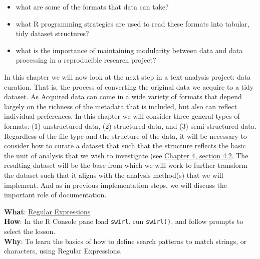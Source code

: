 \documentclass[
  letterpaper,
]{latex/krantz}
\providecommand{\tightlist}{%
  \setlength{\itemsep}{0pt}\setlength{\parskip}{0pt}}\usepackage{longtable,booktabs,array}
\begin{document}
\begin{tcolorbox}[enhanced jigsaw, toprule=.15mm, bottomtitle=1mm, coltitle=black, title=\textcolor{quarto-callout-note-color}{\faInfo}\hspace{0.5em}{Keys}, left=2mm, colframe=quarto-callout-note-color-frame, bottomrule=.15mm, colbacktitle=quarto-callout-note-color!10!white, leftrule=.75mm, colback=white, titlerule=0mm, breakable, toptitle=1mm, opacityback=0, arc=.35mm, rightrule=.15mm, opacitybacktitle=0.6]

\begin{itemize}
\tightlist
\item
  what are some of the formats that data can take?
\item
  what R programming strategies are used to read these formats into
  tabular, tidy dataset structures?
\item
  what is the importance of maintaining modularity between data and data
  processing in a reproducible research project?
\end{itemize}

\end{tcolorbox}

In this chapter we will now look at the next step in a text analysis
project: data curation. That is, the process of converting the original
data we acquire to a tidy dataset. As Acquired data can come in a wide
variety of formats that depend largely on the richness of the metadata
that is included, but also can reflect individual preferences. In this
chapter we will consider three general types of formats: (1)
unstructured data, (2) structured data, and (3) semi-structured data.
Regardless of the file type and the structure of the data, it will be
necessary to consider how to curate a dataset that such that the
structure reflects the basic the unit of analysis that we wish to
investigate (see
\protect\hyperlink{sec-framing-research.htmlux5cux23research-question}{Chapter
4, section 4.2}. The resulting dataset will be the base from which we
will work to further transform the dataset such that it aligns with the
analysis method(s) that we will implement. And as in previous
implementation steps, we will discuss the important role of
documentation.

\begin{tcolorbox}[enhanced jigsaw, toprule=.15mm, bottomtitle=1mm, coltitle=black, title=\textcolor{quarto-callout-tip-color}{\faLightbulb}\hspace{0.5em}{Swirl}, left=2mm, colframe=quarto-callout-tip-color-frame, bottomrule=.15mm, colbacktitle=quarto-callout-tip-color!10!white, leftrule=.75mm, colback=white, titlerule=0mm, breakable, toptitle=1mm, opacityback=0, arc=.35mm, rightrule=.15mm, opacitybacktitle=0.6]

\textbf{What}: \href{https://github.com/lin380/swirl}{Regular
Expressions}\\
\textbf{How}: In the R Console pane load \texttt{swirl}, run
\texttt{swirl()}, and follow prompts to select the lesson.\\
\textbf{Why}: To learn the basics of how to define search patterns to
match strings, or characters, using Regular Expressions.

\end{tcolorbox}
\end{document}
